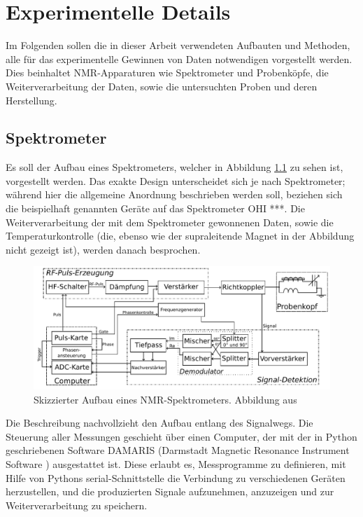 \chapter{Experimentelle Details} \label{chapter:exp_details}

Im Folgenden sollen die in dieser Arbeit verwendeten Aufbauten und Methoden, alle für das experimentelle Gewinnen von Daten notwendigen  vorgestellt werden. Dies beinhaltet NMR-Apparaturen wie Spektrometer und Probenköpfe, die Weiterverarbeitung der Daten, sowie die untersuchten Proben und deren Herstellung.

\section{Spektrometer} \label{section:exp:spektrometer}

Es soll der Aufbau eines Spektrometers, welcher in Abbildung \ref{fig:exp:aufbau} zu sehen ist, vorgestellt werden. Das exakte Design unterscheidet sich je nach Spektrometer; während hier die allgemeine Anordnung beschrieben werden soll, beziehen sich die beispielhaft genannten Geräte auf das Spektrometer OHI ***. Die Weiterverarbeitung der mit dem Spektrometer gewonnenen Daten, sowie die Temperaturkontrolle (die, ebenso wie der supraleitende Magnet in der Abbildung nicht gezeigt ist), werden danach besprochen.

\begin{figure}
	\begin{center}
		\includegraphics[width=\textwidth]{graphics/joachim/aufbau.pdf} 
	\end{center}
	\caption{Skizzierter Aufbau eines NMR-Spektrometers. Abbildung aus \cite[S. 29]{lueg_implementierung_2016}} \label{fig:exp:aufbau}
\end{figure}

Die Beschreibung nachvollzieht den Aufbau entlang des Signalwegs. Die Steuerung aller Messungen geschieht über einen Computer, der mit der in Python geschriebenen Software DAMARIS (Darmstadt Magnetic Resonance Instrument Software \cite{gadke_damaris_2007}) ausgestattet ist. Diese erlaubt es, Messprogramme zu definieren, mit Hilfe von Pythons serial-Schnittstelle die Verbindung zu verschiedenen Geräten herzustellen, und die produzierten Signale aufzunehmen, anzuzeigen und zur Weiterverarbeitung zu speichern.

